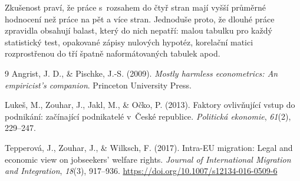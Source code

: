 \documentclass[11pt,a4paper]{article}
\begin{document}
Zkušenost praví, že práce s~rozsahem do čtyř stran mají vyšší průměrné hodnocení než práce na pět a více stran. Jednoduše proto, že dlouhé práce zpravidla obsahují balast, který do nich nepatří: malou tabulku pro každý statistický test, opakované zápisy nulových hypotéz, korelační matici rozprostřenou do tří špatně naformátovaných tabulek apod.

\begin{thebibliography}{9}
 Angrist, J. D., \& Pischke, J.-S. (2009). \textit{Mostly harmless econometrics: An empiricist's companion}. Princeton University Press.

 Lukeš, M., Zouhar, J., Jakl, M., \& Očko, P. (2013). Faktory ovlivňující vstup do podnikání: začínající podnikatelé v~České republice. \textit{Politická ekonomie}, \textit{61}(2), 229--247.

 Tepperová, J., Zouhar, J., \& Wilksch, F. (2017). Intra-EU migration: Legal and economic view on jobseekers' welfare rights. \textit{Journal of International Migration and Integration}, \textit{18}(3), 917--936. \url{https://doi.org/10.1007/s12134-016-0509-6}
\end{thebibliography}
\end{document}
